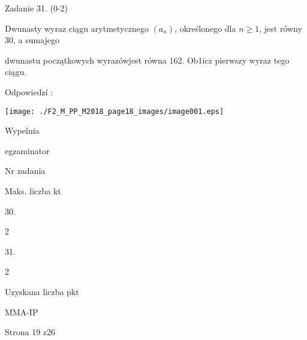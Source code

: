 \documentclass[a4paper,12pt]{article}
\begin{document}
Zadanie 31. (0-2)

Dwunasty wyraz ciągu arytmetycznego $(a_{n})$, określonego dla $n\geq 1$, jest równy 30, a sumajego

dwunastu początkowych wyrazówjest równa 162. Ob1icz pierwszy wyraz tego ciągu.

Odpowiedzí :
\begin{center}
\texttt{[image: ./F2\_M\_PP\_M2018\_page18\_images/image001.eps]}
\end{center}
Wypelnia

egzaminator

Nr zadania

Maks. liczba kt

30.

2

31.

2

Uzyskana liczba pkt

MMA-IP

Strona 19 z26
\end{document}
